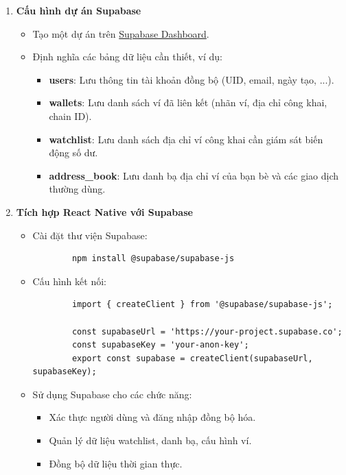 \documentclass[a4paper]{report}
\begin{document}
\begin{enumerate}
    \item \textbf{Cấu hình dự án Supabase}
    \begin{itemize}
        \item Tạo một dự án trên \href{https://supabase.com/}{Supabase Dashboard}.
        \item Định nghĩa các bảng dữ liệu cần thiết, ví dụ:
        \begin{itemize}
            \item \textbf{users}: Lưu thông tin tài khoản đồng bộ (UID, email, ngày tạo, ...).
            \item \textbf{wallets}: Lưu danh sách ví đã liên kết (nhãn ví, địa chỉ công khai, chain ID).
            \item \textbf{watchlist}: Lưu danh sách địa chỉ ví công khai cần giám sát biến động số dư.
            \item \textbf{address\_book}: Lưu danh bạ địa chỉ ví của bạn bè và các giao dịch thường dùng.
        \end{itemize}
    \end{itemize}

    \item \textbf{Tích hợp React Native với Supabase}
    \begin{itemize}
        \item Cài đặt thư viện Supabase:
        \begin{verbatim}
        npm install @supabase/supabase-js
        \end{verbatim}

        \item Cấu hình kết nối:
        \begin{verbatim}
        import { createClient } from '@supabase/supabase-js';

        const supabaseUrl = 'https://your-project.supabase.co';
        const supabaseKey = 'your-anon-key';
        export const supabase = createClient(supabaseUrl, supabaseKey);
        \end{verbatim}

        \item Sử dụng Supabase cho các chức năng:
        \begin{itemize}
            \item Xác thực người dùng và đăng nhập đồng bộ hóa.
            \item Quản lý dữ liệu watchlist, danh bạ, cấu hình ví.
            \item Đồng bộ dữ liệu thời gian thực.
        \end{itemize}
    \end{itemize}


\end{enumerate}
\end{document}
